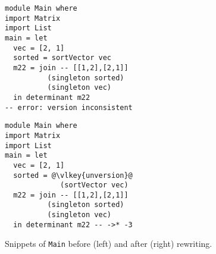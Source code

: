 \begin{figure}[t]

\begin{minipage}{.5\textwidth}
\begin{verbatim}
module Main where
import Matrix
import List
main = let
  vec = [2, 1]
  sorted = sortVector vec
  m22 = join -- [[1,2],[2,1]]
          (singleton sorted)
          (singleton vec)
  in determinant m22
-- error: version inconsistent
\end{verbatim}
\end{minipage}
\begin{minipage}{.5\textwidth}
\begin{verbatim}
module Main where
import Matrix
import List
main = let
  vec = [2, 1]
  sorted = @\vlkey{unversion}@
             (sortVector vec)
  m22 = join -- [[1,2],[2,1]]
          (singleton sorted)
          (singleton vec)
  in determinant m22 -- ->* -3
\end{verbatim}
\end{minipage}
\caption{Snippets of \texttt{Main} before (left) and after (right) rewriting.}
\label{fig6-5}

\end{figure}